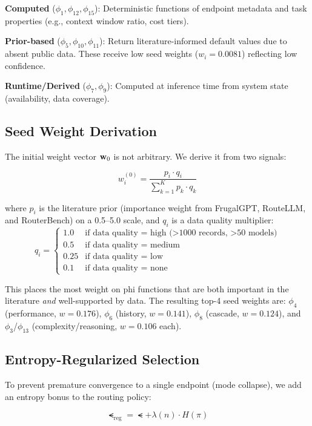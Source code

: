\textbf{Computed} ($\phi_1, \phi_{12}, \phi_{15}$): Deterministic functions of endpoint metadata and task properties (e.g., context window ratio, cost tiers).

\textbf{Prior-based} ($\phi_5, \phi_{10}, \phi_{11}$): Return literature-informed default values due to absent public data. These receive low seed weights ($w_i = 0.0081$) reflecting low confidence.

\textbf{Runtime/Derived} ($\phi_7, \phi_9$): Computed at inference time from system state (availability, data coverage).

\subsection{Seed Weight Derivation}

The initial weight vector $\mathbf{w}_0$ is not arbitrary. We derive it from two signals:

\begin{equation}
\label{eq:seed_weights}
w_i^{(0)} = \frac{p_i \cdot q_i}{\sum_{k=1}^K p_k \cdot q_k}
\end{equation}

where $p_i$ is the literature prior (importance weight from FrugalGPT, RouteLLM, and RouterBench) on a 0.5--5.0 scale, and $q_i$ is a data quality multiplier:
\[
q_i = \begin{cases}
1.0 & \text{if data quality = high (>1000 records, >50 models)} \\
0.5 & \text{if data quality = medium} \\
0.25 & \text{if data quality = low} \\
0.1 & \text{if data quality = none}
\end{cases}
\]

This places the most weight on phi functions that are both important in the literature \emph{and} well-supported by data. The resulting top-4 seed weights are: $\phi_4$ (performance, $w=0.176$), $\phi_6$ (history, $w=0.141$), $\phi_8$ (cascade, $w=0.124$), and $\phi_3$/$\phi_{13}$ (complexity/reasoning, $w=0.106$ each).

\subsection{Entropy-Regularized Selection}

To prevent premature convergence to a single endpoint (mode collapse), we add an entropy bonus to the routing policy:

\begin{equation}
\label{eq:entropy}
\smt_{\text{reg}} = \smt + \lambda(n) \cdot H(\pi)
\end{equation}

